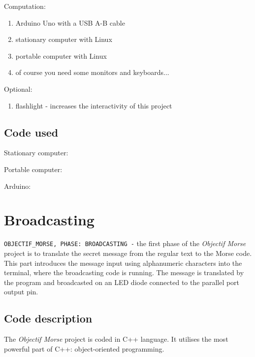 \documentclass[12pt]{report}
\begin{document}
Computation:

\begin{enumerate}

\item Arduino Uno with a USB A-B cable
\item stationary computer with Linux
\item portable computer with Linux
\item of course you need some monitors and keyboards...

\end{enumerate}

Optional:

\begin{enumerate}

\item flashlight - increases the interactivity of this project

\end{enumerate}

\section{Code used}

Stationary computer:



Portable computer:




Arduino:



\newpage

\chapter{Broadcasting}

\verb|OBJECTIF_MORSE, PHASE: BROADCASTING -| the first phase of the \textit{Objectif Morse} project is to translate the secret message from the regular text to the Morse code. This part introduces the message input using alphanumeric characters into the terminal, where the broadcasting code is running. The message is translated by the program and broadcasted on an LED diode connected to the parallel port output pin.

\section{Code description}

The \textit{Objectif Morse} project is coded in C++ language. It utilises the most powerful part of C++: object-oriented programming.
\end{document}
